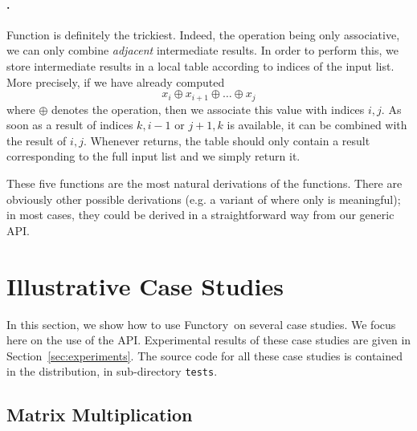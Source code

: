 \documentclass[a4paper,12pt]{article}
\newcommand{\functory}{\textsf{Functory}}
\begin{document}
\paragraph{.}
Function  is definitely the trickiest. Indeed, the
operation being only associative, we can only combine \emph{adjacent}
intermediate results. In order to perform this, we store intermediate
results in a local table according to indices of the input list. More
precisely, if we have already computed
\begin{displaymath}
  x_i \oplus x_{i+1} \oplus \dots \oplus x_j
\end{displaymath}
where $\oplus$ denotes the  operation, then we associate this
value with indices $i,j$. As soon as a result of indices $k,i-1$ or
$j+1,k$ is available, it can be combined with the result of $i,j$.
Whenever  returns, the table should only contain a result
corresponding to the full input list and we simply return it.

\medskip
These five functions are the most natural derivations of the
 functions. There are obviously other possible derivations
(e.g. a variant of  where only  is meaningful);
in most cases, they could be derived in a straightforward way from our
generic API.


\section{Illustrative Case Studies}\label{sec:studies}

In this section, we show how to use \functory\ on several case studies.
We focus here on the use of the API. Experimental results of these
case studies are given in Section~\ref{sec:experiments}.
The source code for all these case studies is contained in the
distribution, in sub-directory \texttt{tests}.

\subsection{Matrix Multiplication}\label{sec:matrix}
\end{document}
